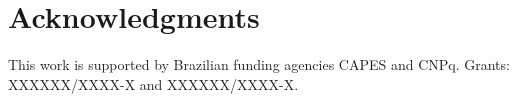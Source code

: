 \documentclass{sigchi}
\begin{document}
\keywords{\plainkeywords}










\section{Acknowledgments}

This work is supported by Brazilian funding agencies CAPES and CNPq. Grants: XXXXXX/XXXX-X and XXXXXX/XXXX-X.

%
%
%
%
%
\balance{}



\end{document}
